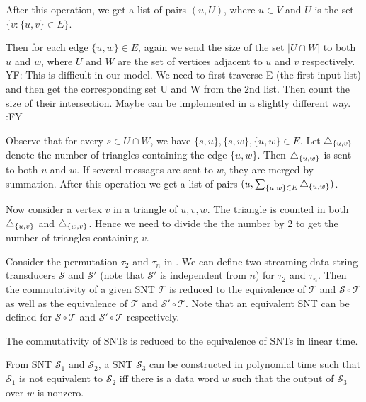 \documentclass[runningheads,a4paper]{llncs}
\def\Ss{{\mathcal{S} }}
\def\Tt{{\mathcal{T} }}
\newcommand{\yfc}[1]{\color{blue} {YF: #1 :FY} \color{black}}
\begin{document}
{After this operation, we get a list of pairs $(u, U)$, where $u \in V$ and $U$ is the set $\{ v : \{ u, v \} \in E \}$.

Then for each edge $\{ u, w \} \in E$, again we send the size of the set $| U \cap W |$ to both $u$ and $w$, where $U$ and $W$ are
the set of vertices adjacent to $u$ and $v$ respectively. 
\yfc{This is difficult in our model. We need to first traverse E (the first input list) and then get the corresponding set U and W from the 2nd list. Then count the size of their intersection. Maybe can be implemented in a slightly different way.}

Observe that for every $s \in U \cap W$, we have $\{ s, u \}, \{ s, w \}, \{ u, w
\} \in E$. Let $\triangle_{\{u, v\}}$ denote the number of triangles
containing the edge $\{ u, w \}$. Then $\triangle_{\{u, w\}}$ is sent to
both $u$ and $w$. If several messages are sent to $w$, they are merged
by summation. After this operation we get a list of pairs $(u, \sum_{\{ u, w \} \in E} \triangle_{\{u, w\}})$.

Now consider a vertex $v$ in a triangle of $u, v, w$. The triangle is
counted in both $\triangle_{\{ u, v \}}$ and $\triangle_{\{ w, v \}}$. Hence
we need to divide the the number by 2 to get the number of triangles containing $v$. }


Consider the permutation $\tau_2$ and $\tau_n$ in \cite{CHSW15}. We can define two streaming data string transducers $\Ss$ and $\Ss'$ (note that $\Ss'$ is independent from $n$)  for $\tau_2$ and $\tau_n$. Then the commutativity of a given SNT $\Tt$ is reduced to the equivalence of $\Tt$ and $\Ss \circ \Tt$ as well as the equivalence of $\Tt$ and $\Ss'\circ \Tt$. Note that an equivalent SNT can be defined for $\Ss \circ \Tt$ and $\Ss' \circ \Tt$ respectively.

\begin{proposition}
The commutativity of SNTs is reduced to the equivalence of SNTs in linear time. 
\end{proposition}

\begin{proposition}
From SNT $\Ss_1$ and $\Ss_2$, a SNT $\Ss_3$ can be constructed in polynomial time such that $\Ss_1$ is not equivalent to $\Ss_2$ iff there is a data word $w$ such that the output of $\Ss_3$ over $w$ is nonzero. 
\end{proposition}
\end{document}
